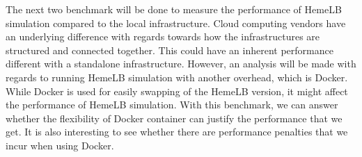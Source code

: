 The next two benchmark will be done to measure the performance of HemeLB simulation compared to the local infrastructure. Cloud computing vendors have an underlying difference with regards towards how the infrastructures are structured and connected together. This could have an inherent performance different with a standalone infrastructure. However, an analysis will be made with regards to running HemeLB simulation with another overhead, which is Docker. While Docker is used for easily swapping of the HemeLB version, it might affect the performance of HemeLB simulation. With this benchmark, we can answer whether the flexibility of Docker container can justify the performance that we get. It is also interesting to see whether there are performance penalties that we incur when using Docker.



